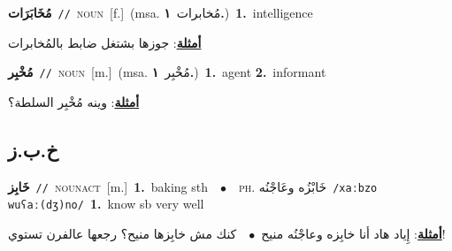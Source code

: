 \documentclass[10pt,a4paper,twoside]{article} %
\begin{document}
\begin{multicols}{2}
{\setlength\topsep{0pt}\textbf{\foreignlanguage{arabic}{مُخَابَرَات}}\ {\color{gray}\texttt{//}\color{black}}\ \textsc{noun}\ [f.]\ \color{gray}(msa. \foreignlanguage{arabic}{مُخابرات}~\foreignlanguage{arabic}{\textbf{١.}})\color{black}\ \textbf{1.}~intelligence\  \begin{flushright}\color{gray}\foreignlanguage{arabic}{\textbf{\underline{\foreignlanguage{arabic}{أمثلة}}}: جوزها بشتغل ضابط بالمُخابرات}\end{flushright}\color{black}} \vspace{2mm}

{\setlength\topsep{0pt}\textbf{\foreignlanguage{arabic}{مُخْبِر}}\ {\color{gray}\texttt{//}\color{black}}\ \textsc{noun}\ [m.]\ \color{gray}(msa. \foreignlanguage{arabic}{مُخْبِر}~\foreignlanguage{arabic}{\textbf{١.}})\color{black}\ \textbf{1.}~agent  \textbf{2.}~informant\  \begin{flushright}\color{gray}\foreignlanguage{arabic}{\textbf{\underline{\foreignlanguage{arabic}{أمثلة}}}: وينه مُخْبِر السلطة؟}\end{flushright}\color{black}} \vspace{2mm}

\vspace{-3mm}
\subsection*{\color{blue}\foreignlanguage{arabic}{خ.ب.ز}\color{blue}{}} 

{\setlength\topsep{0pt}\textbf{\foreignlanguage{arabic}{خَابِز}}\ {\color{gray}\texttt{//}\color{black}}\ \textsc{noun\textunderscore act}\ [m.]\ \textbf{1.}~baking sth\ \ $\bullet$\ \ \textsc{ph.} \color{gray} \foreignlanguage{arabic}{خَابْزُه وعَاجْنُه}\color{black}\ {\color{gray}\texttt{/{\sffamily xaːbzo wuʕaː(dʒ)no}/}\color{black}}\ \textbf{1.}~know sb very well\  \begin{flushright}\color{gray}\foreignlanguage{arabic}{\textbf{\underline{\foreignlanguage{arabic}{أمثلة}}}: إِياد هاد أنا خابِزه وعاجْنُه منيح\ $\bullet$\ \  كنك مش خابِزها منيح؟ رجعها عالفرن تستوي!}\end{flushright}\color{black}} \vspace{2mm}


\end{multicols}
\end{document}
